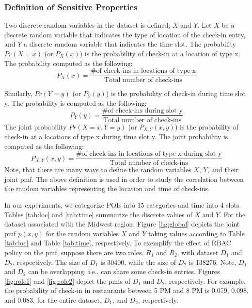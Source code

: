 \subsubsection{Definition of Sensitive Properties}

Two discrete random variables in the dataset is defined; $X$ and $Y$. Let $X$ be a discrete random variable that indicates the type of location of the check-in entry, and $Y$ a discrete random variable that indicates the time slot. The probability $Pr(X=x)$ (or $P_X(x)$) is the probability of check-in at a location of type x. The probability computed as the following:
\begin{equation*}
P_X(x) = \frac{\text{\# of check-ins in locations of type x}}{\text{Total number of check-ins}}
\end{equation*}

Similarly, $Pr(Y=y)$ (or $P_Y(y)$) is the probability of check-in during time slot y. The probability is computed as the following:
\begin{equation*}
P_Y(y) = \frac{\text{\# of check-ins during slot y}}{\text{Total number of check-ins}}
\end{equation*}
The joint probability $Pr(X=x,Y=y)$ (or $P_{X,Y}(x,y)$) is the probability of check-in at a locations of type x during time slot y. The joint probability is computed as the following: 
{\small
\begin{equation*}
P_{X,Y}(x,y) = \frac{\text{\# of check-ins in locations of type x during slot y}}{\text{Total number of check-ins}}
\end{equation*}
}
Note, that there are many ways to define the random variables $X$, $Y$, and their joint pmf. The above definition is used in order to study the correlation between the random variables representing the location and time of check-ins.

In our experiments, we categorize POIs into 15 categories and time into 4 slots. Tables \ref{tab:loc} and \ref{tab:time} summarize the discrete values of $X$ and $Y$. For the dataset associated with the Midwest region, Figure \ref{fig:global} depicts the joint pmf $p(x,y)$ for the random variables  $X$ and $Y$ taking values according to Table \ref{tab:loc} and Table \ref{tab:time}, respectively. To exemplify the effect of RBAC policy on the pmf, suppose there are two roles, $R_1$ and $R_2$, with dataset $D_1$ and $D_2$, respectively. The size of $D_1$ is 30400, while the size of $D_2$ is 138276. Note, $D_1$ and $D_2$ can be overlapping, i.e., can share some check-in entries. Figures \ref{fig:role1} and \ref{fig:role2} depict the pmfs of $D_1$ and $D_2$, respectively. For example, the probability of check-in in restaurants between 5 PM and 8 PM is 0.079, 0.098, and 0.083, for the entire dataset,  $D_1$, and  $D_2$, respectively.

